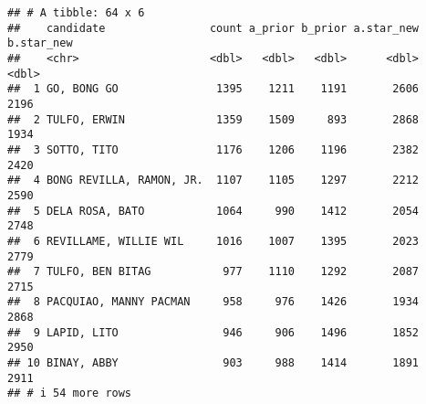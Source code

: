 \documentclass[]{article}
\begin{document}
\begin{verbatim}
## # A tibble: 64 x 6
##    candidate                count a_prior b_prior a.star_new b.star_new
##    <chr>                    <dbl>   <dbl>   <dbl>      <dbl>      <dbl>
##  1 GO, BONG GO               1395    1211    1191       2606       2196
##  2 TULFO, ERWIN              1359    1509     893       2868       1934
##  3 SOTTO, TITO               1176    1206    1196       2382       2420
##  4 BONG REVILLA, RAMON, JR.  1107    1105    1297       2212       2590
##  5 DELA ROSA, BATO           1064     990    1412       2054       2748
##  6 REVILLAME, WILLIE WIL     1016    1007    1395       2023       2779
##  7 TULFO, BEN BITAG           977    1110    1292       2087       2715
##  8 PACQUIAO, MANNY PACMAN     958     976    1426       1934       2868
##  9 LAPID, LITO                946     906    1496       1852       2950
## 10 BINAY, ABBY                903     988    1414       1891       2911
## # i 54 more rows
\end{verbatim}
\end{document}
